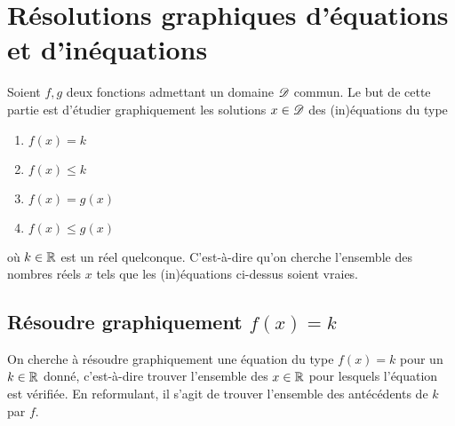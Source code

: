 	
	\section{Résolutions graphiques d'équations et d'inéquations}
	
	Soient $f, g$ deux fonctions admettant un domaine $\mathcal{D}$ commun.
	Le but de cette partie est d'étudier graphiquement les solutions $x\in\mathcal{D}$ des (in)équations du type
		\begin{multicols}{2}
		\begin{enumerate}[label=$\bullet$]
			\item $f(x) = k$
			\item $f(x) \leq k$
			\item $f(x) = g(x)$
			\item $f(x) \leq g(x)$
		\end{enumerate}
		\end{multicols}
	\noindent où $k\in\mathbb{R}$ est un réel quelconque.
	C'est-à-dire qu'on cherche l'ensemble des nombres réels $x$ tels que les (in)équations ci-dessus soient vraies.
	
	\subsection{Résoudre graphiquement $f(x) = k$}
	
	
	On cherche à résoudre graphiquement une équation du type $f(x)=k$ pour un $k\in\mathbb{R}$ donné, c'est-à-dire trouver l'ensemble des $x\in\mathbb{R}$ pour lesquels l'équation est vérifiée.
	En reformulant, il s'agit de trouver l'ensemble des antécédents de $k$ par $f$. 
	
